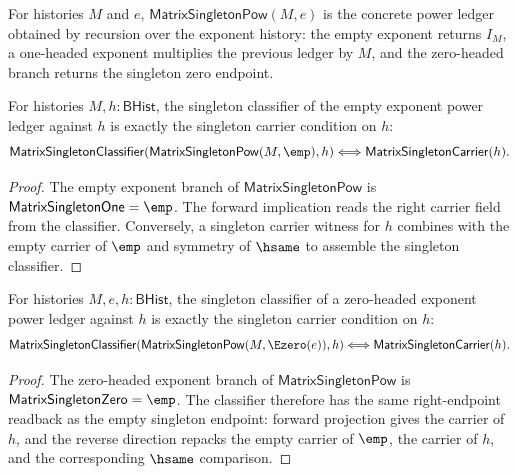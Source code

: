 \begin{definition}
\label{def:matrix-singleton-pow}
For histories $M$ and $e$, $\mathsf{MatrixSingletonPow}(M,e)$ is the concrete
power ledger obtained by recursion over the exponent history: the empty
exponent returns $I_M$, a one-headed exponent multiplies the previous ledger
by $M$, and the zero-headed branch returns the singleton zero endpoint.
\end{definition}

\begin{theorem}
\label{thm:matrix-singleton-pow-empty-exponent-classifier-iff}
For histories $M,h:\mathsf{BHist}$, the singleton classifier of the empty
exponent power ledger against $h$ is exactly the singleton carrier condition
on $h$:
$$
\mathsf{MatrixSingletonClassifier}(\mathsf{MatrixSingletonPow}(M,\emp),h)
\Longleftrightarrow
\mathsf{MatrixSingletonCarrier}(h).
$$
\end{theorem}
\begin{proof}
The empty exponent branch of $\mathsf{MatrixSingletonPow}$ is
$\mathsf{MatrixSingletonOne}=\emp$. The forward implication reads the right
carrier field from the classifier. Conversely, a singleton carrier witness
for $h$ combines with the empty carrier of $\emp$ and symmetry of $\hsame$ to
assemble the singleton classifier.
\end{proof}

\begin{theorem}
\label{thm:matrix-singleton-pow-zero-head-exponent-classifier-iff}
For histories $M,e,h:\mathsf{BHist}$, the singleton classifier of a
zero-headed exponent power ledger against $h$ is exactly the singleton carrier
condition on $h$:
$$
\mathsf{MatrixSingletonClassifier}(\mathsf{MatrixSingletonPow}(M,\Ezero(e)),h)
\Longleftrightarrow
\mathsf{MatrixSingletonCarrier}(h).
$$
\end{theorem}
\begin{proof}
The zero-headed exponent branch of $\mathsf{MatrixSingletonPow}$ is
$\mathsf{MatrixSingletonZero}=\emp$. The classifier therefore has the same
right-endpoint readback as the empty singleton endpoint: forward projection
gives the carrier of $h$, and the reverse direction repacks the empty carrier
of $\emp$, the carrier of $h$, and the corresponding $\hsame$ comparison.
\end{proof}

